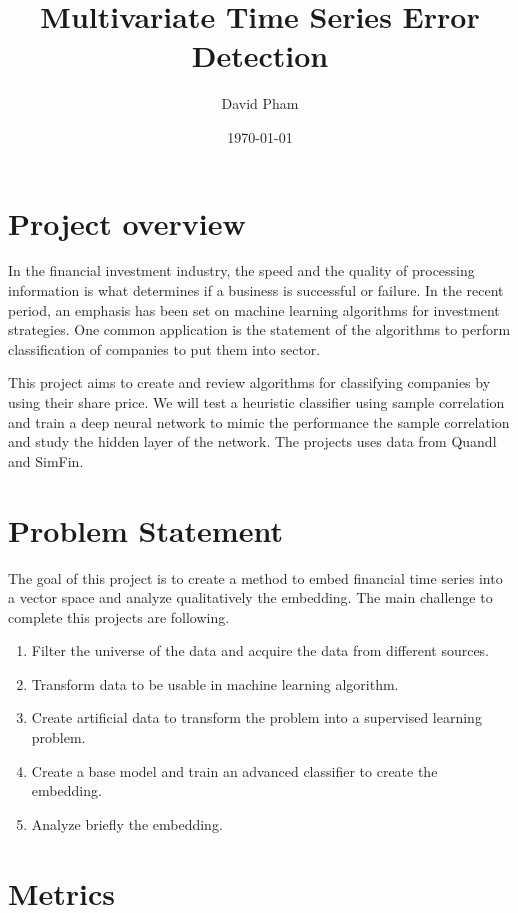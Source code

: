 \documentclass[a4paper,twoside]{article}
\author{David Pham}
\date{\today}
\title{Multivariate Time Series Error Detection}
\begin{document}
\maketitle
\tableofcontents


\section{Project overview}
\label{sec:org49f5cc4}

In the financial investment industry, the speed and the quality of processing
information is what determines if a business is successful or failure. In the
recent period, an emphasis has been set on machine learning algorithms for
investment strategies. One common application is the statement of the algorithms
to perform classification of companies to put them into sector.

This project aims to create and review algorithms for classifying companies by
using their share price. We will test a heuristic classifier using sample
correlation and train a deep neural network to mimic the performance the sample
correlation and study the hidden layer of the network. The projects uses data
from Quandl and SimFin.

\section{Problem Statement}
\label{sec:orgbb3d104}

The goal of this project is to create a method to embed financial time series
into a vector space and analyze qualitatively the embedding. The main
challenge to complete this projects are following.

\begin{enumerate}
\item Filter the universe of the data and acquire the data from different
sources.
\item Transform data to be usable in machine learning algorithm.
\item Create artificial data to transform the problem into a supervised learning problem.
\item Create a base model and train an advanced classifier to create the embedding.
\item Analyze briefly the embedding.
\end{enumerate}


\section{Metrics}
\label{sec:org4beb1d4}
\end{document}

